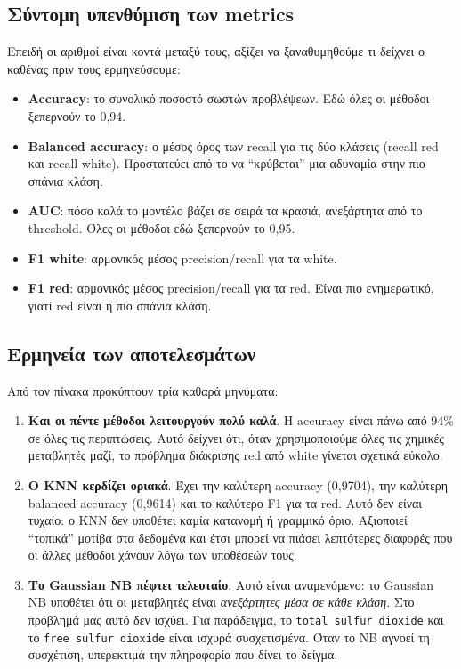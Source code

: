 \documentclass[11pt,a4paper]{article}
\newcommand{\code}[1]{\texttt{#1}}
\begin{document}
\subsection{Σύντομη υπενθύμιση των metrics}

Επειδή οι αριθμοί είναι κοντά μεταξύ τους, αξίζει να ξαναθυμηθούμε τι
δείχνει ο καθένας πριν τους ερμηνεύσουμε:
\begin{itemize}
    \item \textbf{Accuracy}: το συνολικό ποσοστό σωστών προβλέψεων. Εδώ
    όλες οι μέθοδοι ξεπερνούν το 0,94.
    \item \textbf{Balanced accuracy}: ο μέσος όρος των recall για τις δύο
    κλάσεις (recall red και recall white). Προστατεύει από το να
    ``κρύβεται'' μια αδυναμία στην πιο σπάνια κλάση.
    \item \textbf{AUC}: πόσο καλά το μοντέλο βάζει σε σειρά τα κρασιά,
    ανεξάρτητα από το threshold. Όλες οι μέθοδοι εδώ ξεπερνούν το 0,95.
    \item \textbf{F1 white}: αρμονικός μέσος precision/recall για τα
    white.
    \item \textbf{F1 red}: αρμονικός μέσος precision/recall για τα red.
    Είναι πιο ενημερωτικό, γιατί red είναι η πιο σπάνια κλάση.
\end{itemize}

\subsection{Ερμηνεία των αποτελεσμάτων}

Από τον πίνακα προκύπτουν τρία καθαρά μηνύματα:
\begin{enumerate}
    \item \textbf{Και οι πέντε μέθοδοι λειτουργούν πολύ καλά}. Η accuracy
    είναι πάνω από 94\% σε όλες τις περιπτώσεις. Αυτό δείχνει ότι, όταν
    χρησιμοποιούμε όλες τις χημικές μεταβλητές μαζί, το πρόβλημα διάκρισης
    red από white γίνεται σχετικά εύκολο.

    \item \textbf{Ο KNN κερδίζει οριακά}. Έχει την καλύτερη accuracy
    (0,9704), την καλύτερη balanced accuracy (0,9614) και το καλύτερο
    F1 για τα red. Αυτό δεν είναι τυχαίο: ο KNN δεν υποθέτει καμία
    κατανομή ή γραμμικό όριο. Αξιοποιεί ``τοπικά'' μοτίβα στα δεδομένα
    και έτσι μπορεί να πιάσει λεπτότερες διαφορές που οι άλλες μέθοδοι
    χάνουν λόγω των υποθέσεών τους.

    \item \textbf{Το Gaussian NB πέφτει τελευταίο}. Αυτό είναι
    αναμενόμενο: το Gaussian NB υποθέτει ότι οι μεταβλητές είναι
    \emph{ανεξάρτητες μέσα σε κάθε κλάση}. Στο πρόβλημά μας αυτό δεν
    ισχύει. Για παράδειγμα, το \code{total sulfur dioxide} και το
    \code{free sulfur dioxide} είναι ισχυρά συσχετισμένα. Όταν το NB
    αγνοεί τη συσχέτιση, υπερεκτιμά την πληροφορία που δίνει το δείγμα.
\end{enumerate}
\end{document}
